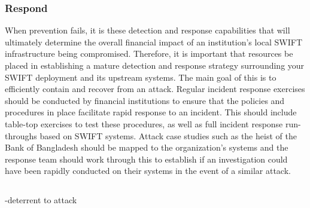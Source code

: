 \documentclass[12pt]{article}
\begin{document}
        \subsubsection{Respond}
        When prevention fails, it is these detection and response capabilities that will ultimately determine the overall financial impact of an institution’s local SWIFT infrastructure being compromised. Therefore, it is important that resources be placed in establishing a mature detection and response strategy surrounding your SWIFT deployment and its upstream systems. The main goal of this is to efficiently contain and recover from an attack.
        Regular incident response exercises should be conducted by financial institutions to ensure that the policies and procedures in place facilitate rapid response to an incident. This should include table-top exercises to test these procedures, as well as full incident response run-throughs based on SWIFT systems. Attack case studies such as the heist of the Bank of Bangladesh should be mapped to the organization’s systems and the response team should work through this to establish if an investigation could have been rapidly conducted on their systems in the event of a similar attack.
        
        \subsection{}  
        -deterrent to attack

    \begin{flushright}
    \end{flushright}
    \newpage
    \printbibliography[heading=bibintoc]
\end{document}
